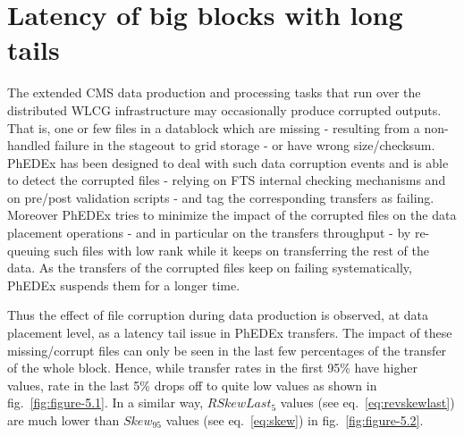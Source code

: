 \section{Latency of big blocks with long tails}
\label{sec:tails}

The extended CMS data production and processing tasks that run over
the distributed WLCG infrastructure may occasionally produce corrupted
outputs. That is, one or few files in a datablock which are missing -
resulting from a non-handled failure in the stageout to grid storage -
or have wrong size/checksum.  PhEDEx has been designed to deal with
such data corruption events and is able to detect the corrupted files
- relying on FTS internal checking mechanisms and on pre/post
validation scripts - and tag the corresponding transfers as
failing. Moreover PhEDEx tries to minimize the impact of the corrupted
files on the data placement operations - and in particular on the
transfers throughput - by re-queuing such files with low rank while it
keeps on transferring the rest of the data. As the transfers of the corrupted
files keep on failing systematically, PhEDEx suspends them for a
longer time.

Thus the effect of file corruption during data production is observed,
at data placement level, as a latency tail issue in PhEDEx transfers.
The impact of these missing/corrupt files can only be seen in the last
few percentages of the transfer of the whole block. Hence, while
transfer rates in the first 95\% have higher values, rate in the last
5\% drops off to quite low values as shown in
fig.~\ref{fig:figure-5.1}. In a similar way, $RSkewLast_5$ values (see
eq.~\ref{eq:revskewlast}) are much lower than $Skew_{95}$ values (see
eq.~\ref{eq:skew}) in fig.~\ref{fig:figure-5.2}.

